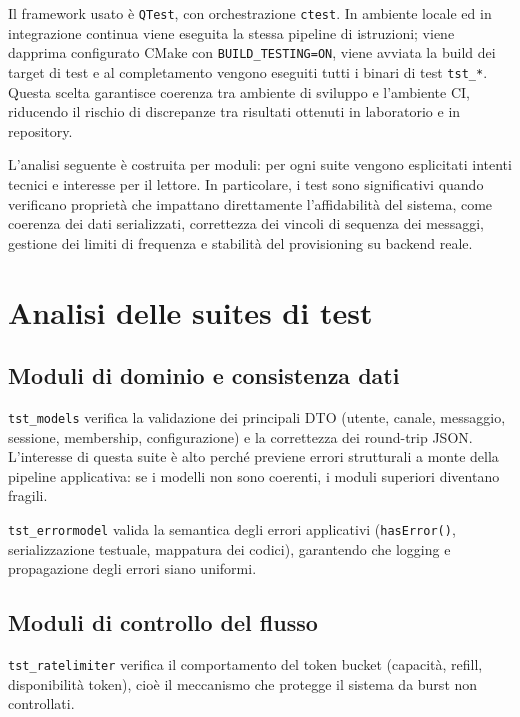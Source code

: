 \documentclass[a4paper, 11pt, twoside]{report}
\begin{document}
Il framework usato è \texttt{QTest}, con orchestrazione \texttt{ctest}. In ambiente locale ed in integrazione continua viene
eseguita la stessa pipeline di istruzioni; viene dapprima configurato CMake con \texttt{BUILD\_TESTING=ON}, viene avviata
la build dei target di test e al completamento vengono eseguiti tutti i binari di test \texttt{tst\_*}. Questa scelta garantisce
coerenza tra ambiente di sviluppo e l'ambiente CI, riducendo il rischio di discrepanze tra risultati ottenuti in laboratorio e
in repository.

L'analisi seguente è costruita per moduli: per ogni suite vengono esplicitati intenti tecnici e interesse per il lettore. In 
particolare, i test sono significativi quando verificano proprietà che impattano direttamente l'affidabilità del sistema, come
coerenza dei dati serializzati, correttezza dei vincoli di sequenza dei messaggi, gestione dei limiti di frequenza e stabilità del 
provisioning su backend reale.

\newpage

\section{Analisi delle suites di test}

\subsection{Moduli di dominio e consistenza dati}

\texttt{tst\_models} verifica la validazione dei principali DTO (utente, canale, messaggio, sessione, membership, configurazione)
e la correttezza dei round-trip JSON. L'interesse di questa suite è alto perché previene errori strutturali a monte della pipeline 
applicativa: se i modelli non sono coerenti, i moduli superiori diventano fragili.

\texttt{tst\_errormodel} valida la semantica degli errori applicativi (\texttt{hasError()}, serializzazione testuale, mappatura dei
codici), garantendo che logging e propagazione degli errori siano uniformi.

\subsection{Moduli di controllo del flusso}

\texttt{tst\_ratelimiter} verifica il comportamento del token bucket (capacità, refill, disponibilità token), cioè il meccanismo che
protegge il sistema da burst non controllati.
\end{document}
